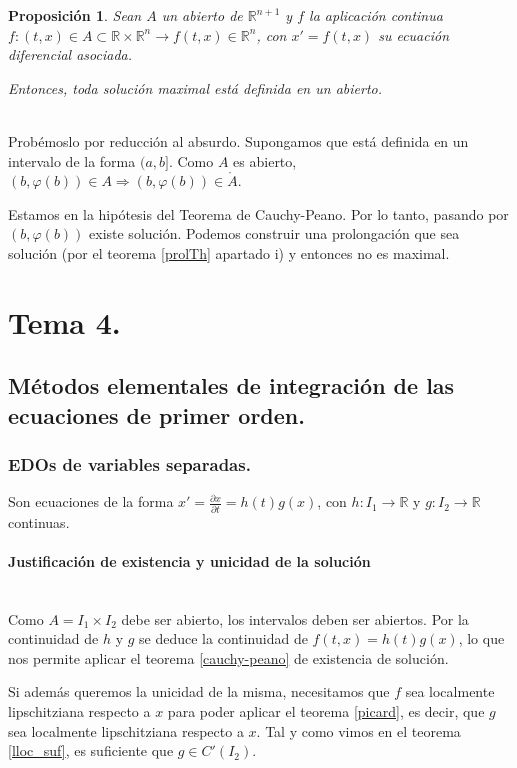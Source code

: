 \documentclass[11pt]{article}
\makeatletter
\theoremstyle{theorem-style}  %
\newtheorem{proposition}[theorem]{Proposición}
\renewenvironment{proof}[1][\proofname]{\par
	\pushQED{\qed}%
	\normalfont \topsep6\p@\@plus6\p@\relax
	\list{}{%
		\settowidth{\leftmargin}{\quad:\hskip\labelsep}%
		\setlength{\labelwidth}{0pt}%
		\setlength{\itemindent}{-\leftmargin}%
	}%
	\item[\hskip\labelsep\itshape#1\@addpunct{:}]\ignorespaces
}{%
	\popQED\endlist\@endpefalse
}
\theoremstyle{definition-style}
\theoremstyle{example-style}
\makeatother
\begin{document}
\begin{proposition}
	Sean $ A $ un abierto de $ \mathbb{R}^{n+1} $ y $ f $ la aplicación continua $ f:(t,x)\in A\subset \mathbb{R}\times \mathbb{R}^n \longrightarrow f(t,x)\in \mathbb{R}^n $, con $  x'=f(t,x) $ su ecuación diferencial asociada. 
	
	Entonces, toda solución maximal está definida en un abierto.
\end{proposition}
\begin{proof}\ \\
	Probémoslo por reducción al absurdo. Supongamos que está definida en un intervalo de la forma $ (a,b] $.
	Como $ A $ es abierto, $ (b,\varphi(b))\in A \Rightarrow (b, \varphi(b)) \in \mathring{A} $.
	
	Estamos en la hipótesis del Teorema de Cauchy-Peano. Por lo tanto, pasando por $ (b, \varphi(b)) $ existe solución. Podemos construir una prolongación que sea solución (por el teorema \ref{prolTh} apartado i) y entonces no es maximal.
\end{proof}

\pagebreak
\section{Tema 4.}
\subsection{Métodos elementales de integración de las ecuaciones de primer orden.}
\subsubsection{EDOs de variables separadas.}
Son ecuaciones de la forma $ x'=\frac{\partial x}{\partial t}=h(t)g(x) $, con $ h:I_1\longrightarrow\mathbb{R} $ y $ g:I_2\longrightarrow\mathbb{R} $ continuas. 
\paragraph{Justificación de existencia y unicidad de la solución} \ \\
Como $ A=I_1\times I_2 $ debe ser abierto, los intervalos deben ser abiertos. Por la continuidad de $ h $ y $ g $ se deduce la continuidad de $ f(t,x)=h(t)g(x) $, lo que nos permite aplicar el teorema \ref{cauchy-peano} de existencia de solución.

Si además queremos la unicidad de la misma, necesitamos que $ f $ sea localmente lipschitziana respecto a $ x $ para poder aplicar el teorema \ref{picard}, es decir, que $ g $ sea localmente lipschitziana respecto a $ x $. Tal y como vimos en el teorema \ref{lloc_suf}, es suficiente que $ g\in C'(I_2) $.
\end{document}
